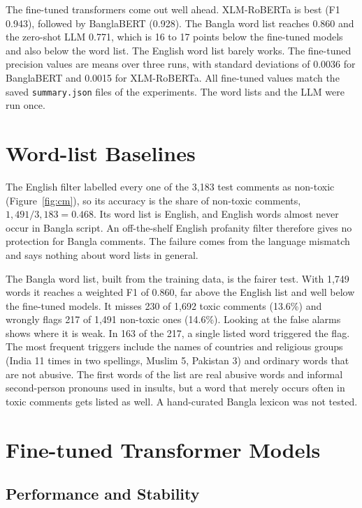 The fine-tuned transformers come out well ahead. XLM-RoBERTa is best (F1 0.943), followed by BanglaBERT (0.928). The Bangla word list reaches 0.860 and the zero-shot LLM 0.771, which is 16 to 17 points below the fine-tuned models and also below the word list. The English word list barely works. The fine-tuned precision values are means over three runs, with standard deviations of 0.0036 for BanglaBERT and 0.0015 for XLM-RoBERTa. All fine-tuned values match the saved \texttt{summary.json} files of the experiments. The word lists and the LLM were run once.

\section{Word-list Baselines}

The English filter labelled every one of the 3,183 test comments as non-toxic (Figure~\ref{fig:cm}), so its accuracy is the share of non-toxic comments, $1{,}491/3{,}183=0.468$. Its word list is English, and English words almost never occur in Bangla script. An off-the-shelf English profanity filter therefore gives no protection for Bangla comments. The failure comes from the language mismatch and says nothing about word lists in general.

The Bangla word list, built from the training data, is the fairer test. With 1,749 words it reaches a weighted F1 of 0.860, far above the English list and well below the fine-tuned models. It misses 230 of 1,692 toxic comments (13.6\%) and wrongly flags 217 of 1,491 non-toxic ones (14.6\%). Looking at the false alarms shows where it is weak. In 163 of the 217, a single listed word triggered the flag. The most frequent triggers include the names of countries and religious groups (India 11 times in two spellings, Muslim 5, Pakistan 3) and ordinary words that are not abusive. The first words of the list are real abusive words and informal second-person pronouns used in insults, but a word that merely occurs often in toxic comments gets listed as well. A hand-curated Bangla lexicon was not tested.

\section{Fine-tuned Transformer Models}

\subsection{Performance and Stability}

